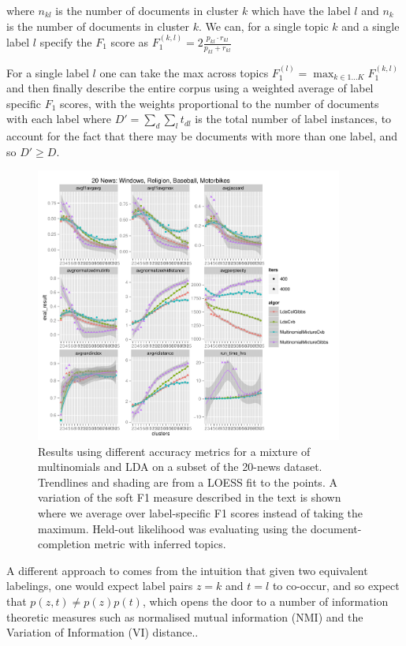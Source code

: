 where $n_{kl}$ is the number of documents in cluster $k$ which have the label $l$ and $n_k$ is the number of documents in cluster $k$. We can, for a single topic $k$ and a single label $l$ specify the $F_1$ score as $F_1^{(k,l)} = 2 \frac{p_{kl} \cdot {r_{kl}}}{p_{kl} + {r_{kl}}}$

For a single label $l$ one can take the max across topics $F_1^{(l)} = \max_{k \in 1\ldots K} F_1^{(k,l)}$ and then finally describe the entire corpus using a weighted average of label specific $F_1$ scores, with the weights proportional to the number of documents with each label where $D' = \sum_d \sum_l t_{dl}$ is the total number of label instances, to account for the fact that there may be documents with more than one label, and so $D' \geq D$.


\begin{figure}
  \centering
    \includegraphics[width=0.9\textwidth]{plots/20news-2013-03-25.pdf}
  \caption{Results using different accuracy metrics for a mixture of multinomials and LDA on a subset of the 20-news dataset. Trendlines and shading are from a LOESS fit to the points. A variation of the soft F1 measure described in the text is shown where we average over label-specific F1 scores instead of taking the maximum. Held-out likelihood was evaluating using the document-completion metric with inferred topics.}
  \label{fig:eval-metrics-shootout}
\end{figure}


A different approach to comes from the intuition that given two equivalent labelings, one would expect label pairs $z=k$ and $t=l$ to co-occur, and so expect that $p(z,t) \neq p(z)p(t)$, which opens the door to a number of information theoretic measures such as normalised mutual information (NMI) and the Variation of Information (VI) distance..

